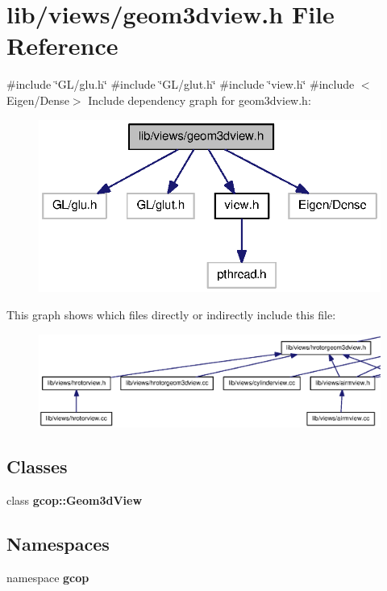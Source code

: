 \section{lib/views/geom3dview.h \-File \-Reference}
\label{geom3dview_8h}
{\ttfamily \#include \char`\"{}\-G\-L/glu.\-h\char`\"{}}\*
{\ttfamily \#include \char`\"{}\-G\-L/glut.\-h\char`\"{}}\*
{\ttfamily \#include \char`\"{}view.\-h\char`\"{}}\*
{\ttfamily \#include $<$\-Eigen/\-Dense$>$}\*
\-Include dependency graph for geom3dview.\-h\-:\nopagebreak
\begin{figure}[H]
\begin{center}
\leavevmode
\includegraphics[width=322pt]{geom3dview_8h__incl}
\end{center}
\end{figure}
\-This graph shows which files directly or indirectly include this file\-:\nopagebreak
\begin{figure}[H]
\begin{center}
\leavevmode
\includegraphics[width=350pt]{geom3dview_8h__dep__incl}
\end{center}
\end{figure}
\subsection*{\-Classes}
\begin{DoxyCompactItemize}
\item 
class {\bf gcop\-::\-Geom3d\-View}
\end{DoxyCompactItemize}
\subsection*{\-Namespaces}
\begin{DoxyCompactItemize}
\item 
namespace {\bf gcop}
\end{DoxyCompactItemize}
